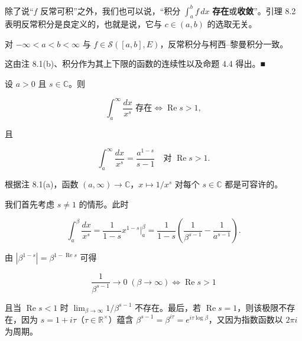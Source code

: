 除了说“$ f $ 反常可积”之外，我们也可以说，“积分 $ \int_{a}^{b} f\,dx $ \textbf{存在}或\textbf{收敛}”。引理 8.2 表明反常积分是良定义的，也就是说，它与 $ c \in (a, b) $ 的选取无关。

\begin{proposition}

对 $ -\infty < a < b < \infty $ 与 $ f \in \mathcal{S}([a, b], E) $，反常积分与柯西–黎曼积分一致。

\proofhead
这由注 8.1(b)、积分作为其上下限的函数的连续性以及命题 4.4 得出。\nobreak\hspace{0.35em}■
\end{proposition}

\begin{example}

\begin{items}
\item

设 $ a > 0 $ 且 $ s \in \mathbb{C} $。则

\[
\int_{a}^{\infty} \frac{dx}{x^{s}} \text{ 存在} \Longleftrightarrow \operatorname{Re} s > 1 ,
\]

且

\[
\int_{a}^{\infty} \frac{dx}{x^{s}} = \frac{a^{1-s}}{s - 1} \quad \text{对 } \operatorname{Re} s > 1 .
\]

\proofhead
根据注 8.1(a)，函数 $ (a, \infty) \to \mathbb{C} $，$ x \mapsto 1/x^{s} $ 对每个 $ s \in \mathbb{C} $ 都是可容许的。

\begin{subitems}
\item

我们首先考虑 $ s \ne 1 $ 的情形。此时

\[
\int_{a}^{\beta} \frac{dx}{x^{s}} = \frac{1}{1 - s} x^{1-s} \Big|_{a}^{\beta} = \frac{1}{1 - s} \left( \frac{1}{\beta^{s-1}} - \frac{1}{a^{s-1}} \right) .
\]

由 $ \left| \beta^{1-s} \right| = \beta^{1 - \operatorname{Re} s} $ 可得

\[
\frac{1}{\beta^{s-1}} \to 0 \; (\beta \to \infty) \Longleftrightarrow \operatorname{Re} s > 1
\]

且当 $ \operatorname{Re} s < 1 $ 时 $ \lim_{\beta \to \infty} 1/\beta^{s-1} $ 不存在。最后，若 $ \operatorname{Re} s = 1 $，则该极限不存在，因为 $ s = 1 + i\tau $（$ \tau \in \mathbb{R}^{\times} $）蕴含 $ \beta^{s-1} = \beta^{i\tau} = e^{i\tau\log\beta} $，又因为指数函数以 $ 2\pi i $ 为周期。

\item


\end{subitems}
\end{items}
\end{example}
